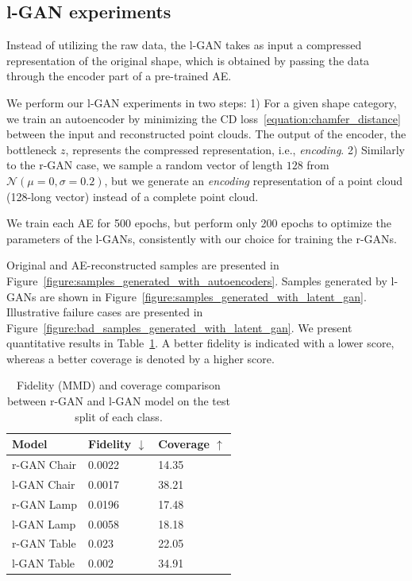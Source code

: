 \documentclass[12pt]{article}
\begin{document}
    \subsection{l-GAN experiments} Instead of utilizing the raw data, the l-GAN takes as input a compressed representation of the original shape, which is obtained by passing the data through the encoder part of a pre-trained AE.

    We perform our l-GAN experiments in two steps:
    1) For a given shape category, we train an autoencoder by minimizing the CD loss~\eqref{equation:chamfer_distance} between the input and reconstructed point clouds. The output of the encoder, the bottleneck $z$, represents the compressed representation, i.e., \textit{encoding}.
    2) Similarly to the r-GAN case, we sample a random vector of length $128$ from $\mathcal{N}(\mu=0,\sigma=0.2)$, but we generate an \textit{encoding} representation of a point cloud (128-long vector) instead of a complete point cloud.

    We train each AE for 500 epochs, but perform only 200 epochs to optimize the parameters of the l-GANs, consistently with our choice for training the r-GANs.

    Original and AE-reconstructed samples are presented in Figure~\ref{figure:samples_generated_with_autoencoders}. Samples generated by l-GANs are shown in Figure~\ref{figure:samples_generated_with_latent_gan}. Illustrative failure cases are presented in Figure~\ref{figure:bad_samples_generated_with_latent_gan}. We present quantitative results in Table~\ref{table:results}. A better fidelity is indicated with a lower score, whereas a better coverage is denoted by a higher score.

    \begin{table}[H]
        \centering
        \caption{Fidelity (MMD) and coverage comparison between r-GAN and l-GAN model on the test split of each class. }
        \begin{tabular}{lll}
            \toprule
            Model       & Fidelity $\downarrow$ & Coverage $\uparrow$ \\
            \midrule
            r-GAN Chair & 0.0022                & 14.35               \\
            l-GAN Chair & 0.0017                & 38.21               \\
            \midrule
            r-GAN Lamp  & 0.0196                & 17.48               \\
            l-GAN Lamp  & 0.0058                & 18.18               \\
            \midrule
            r-GAN Table & 0.023                 & 22.05               \\
            l-GAN Table & 0.002                 & 34.91               \\
            \bottomrule
        \end{tabular}
        \label{table:results}
    \end{table}
\end{document}
